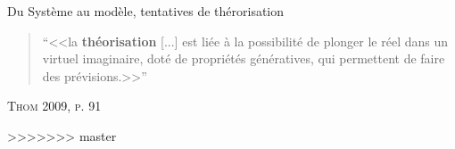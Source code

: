 \documentclass[newPxFont]{beamer}
\begin{document}
\begin{frame}[c]{Du Système au modèle, tentatives de thérorisation}
\vspace{-1em}
\begin{quote}
  \enquote{<<la \textbf{théorisation} [...] est liée à la possibilité de plonger le réel dans un virtuel imaginaire, doté de propriétés génératives, qui permettent de faire des prévisions.>>}
\end{quote}
\hspace*{\fill}\textsc{Thom 2009, p. 91}
\vspace{-0.5em}
\begin{figure}
 	\centering
 		\hspace{0.2em} %
    \hspace{0.2em} %
 		\hspace{0.2em} %
\end{figure}
>>>>>>> master
\end{frame}
\end{document}
